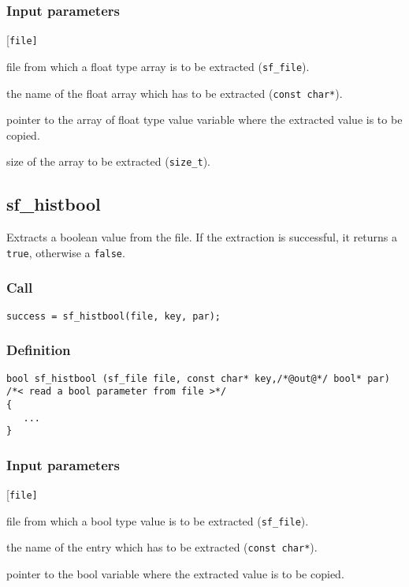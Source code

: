 \subsubsection*{Input parameters}
\begin{desclist}{\tt }{\quad}[\tt file]
   \setlength\itemsep{0pt}
   \item[file] file from which a float type array is to be extracted (\texttt{sf\_file}). 
   \item[key]  the name of the float array which has to be extracted (\texttt{const char*}).
   \item[par]  pointer to the array of float type value variable where the extracted value is to be copied. 
   \item[n]    size of the array to be extracted  (\texttt{size\_t}).
\end{desclist}




\subsection{{sf\_histbool}}
Extracts a boolean value from the file. If the extraction is successful, it returns a \texttt{true}, otherwise a \texttt{false}.

\subsubsection*{Call}
\begin{verbatim}success = sf_histbool(file, key, par);\end{verbatim}

\subsubsection*{Definition}
\begin{verbatim}
bool sf_histbool (sf_file file, const char* key,/*@out@*/ bool* par) 
/*< read a bool parameter from file >*/
{
   ...
}
\end{verbatim}

\subsubsection*{Input parameters}
\begin{desclist}{\tt }{\quad}[\tt file]
   \setlength\itemsep{0pt}
   \item[file] file from which a bool type value is to be extracted (\texttt{sf\_file}).
   \item[key]  the name of the entry which has to be extracted (\texttt{const char*}).
   \item[par]  pointer to the bool variable where the extracted value is to be copied.
\end{desclist}

